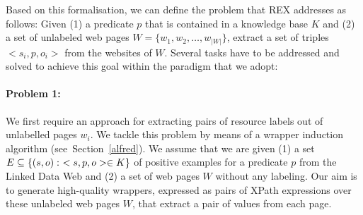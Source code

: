 Based on this formalisation, we can define the problem that REX addresses as follows: Given (1)
a predicate $p$ that is contained in a knowledge base $K$ 
and (2) a set of unlabeled web pages $W = \{w_1, w_2, \ldots, w_{|W|}\}$,
extract a set of triples $<s_i, p, o_i>$ from the websites of $W$.
Several tasks have to be addressed and solved to achieve this goal within the paradigm that we adopt: %


\paragraph{Problem 1:}
We first require an approach for extracting pairs of resource labels out of unlabelled pages $w_i$. 
We tackle this problem by means of a wrapper induction algorithm (see~Section~\ref{alfred}). 
We assume that we are given (1) a set ${\examples} \subseteq \{(s,o):\ <s,p,o> \in K\}$ of positive examples for a predicate $p$ from the Linked Data Web and (2) a set of web pages $W$ without any labeling. 
Our aim is to generate high-quality wrappers, expressed as pairs of XPath expressions over these unlabeled web pages $W$, that extract a pair of values from each page.
